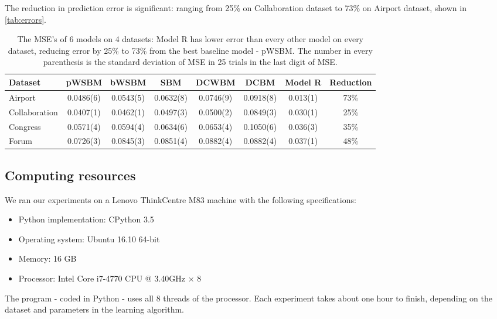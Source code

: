 \documentclass[letterpaper]{article}
\begin{document}
The reduction in prediction error is significant:
ranging from 25\% on Collaboration dataset to 73\% on Airport dataset,
shown in \autoref{tab:errors}.
\begin{table}[!htb]
	\centering
	\caption{
		The MSE's of 6 models on 4 datasets:
		Model R has lower error than every other model on every dataset,
		reducing error by 25\% to 73\% from the best baseline model - pWSBM.
		The number in every parenthesis is the standard deviation of MSE in 25 trials in the last digit of MSE.
	}
	\begin{tabularx}{\textwidth}{|X|c|c|c|c|c|c|c|} \hline \rowcolor{blue!50}
		Dataset & pWSBM & bWSBM & SBM & DCWBM & DCBM & Model R & Reduction \\ \hline
		Airport & 0.0486(6) & 0.0543(5) & 0.0632(8) & 0.0746(9) & 0.0918(8) & 0.013(1) & 73\% \\ \hline
		Collaboration & 0.0407(1) & 0.0462(1) & 0.0497(3) & 0.0500(2) & 0.0849(3) & 0.030(1) & 25\% \\ \hline
		Congress & 0.0571(4) & 0.0594(4) & 0.0634(6) & 0.0653(4) & 0.1050(6) & 0.036(3) & 35\% \\ \hline
		Forum & 0.0726(3) & 0.0845(3) & 0.0851(4) & 0.0882(4) & 0.0882(4) & 0.037(1) & 48\% \\ \hline
	\end{tabularx}
	\label{tab:errors}
\end{table}

\subsection{Computing resources}
We ran our experiments on a Lenovo ThinkCentre M83 machine with the following specifications:
\begin{itemize}
	\item Python implementation: CPython 3.5
	\item Operating system: Ubuntu 16.10 64-bit
	\item Memory: 16 GB
	\item Processor: Intel Core i7-4770 CPU @ 3.40GHz $ \times $ 8
\end{itemize}
The program - coded in Python - uses all 8 threads of the processor.
Each experiment takes about one hour to finish,
depending on the dataset and parameters in the learning algorithm.



\end{document}
